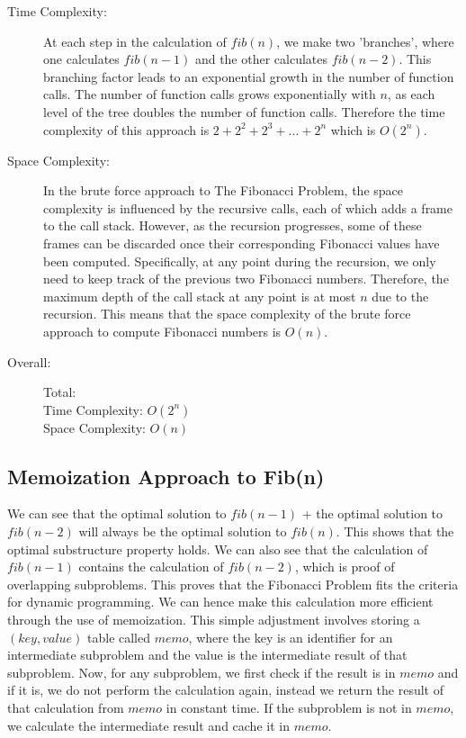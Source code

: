 \begin{description}
    \item[Time Complexity:]
    At each step in the calculation of $fib(n)$, we make two 'branches', where one calculates $fib(n-1)$ and the other calculates $fib(n-2)$.
    This branching factor leads to an exponential growth in the number of function calls.
    The number of function calls grows exponentially with $n$, as each level of the tree doubles the number of function calls.
    Therefore the time complexity of this approach is $2 + 2^2 + 2^3 + ... + 2^n$ which is $O(2^n)$.
        
    \item[Space Complexity:] 
        In the brute force approach to The Fibonacci Problem, the space complexity is influenced by the recursive calls, each of which adds a frame to the call stack. However, as the recursion progresses, some of these frames can be discarded once their corresponding Fibonacci values have been computed.
        Specifically, at any point during the recursion, we only need to keep track of the previous two Fibonacci numbers. Therefore, the maximum depth of the call stack at any point is at most $n$ due to the recursion.
        This means that the space complexity of the brute force approach to compute Fibonacci numbers is $O(n)$.
        
        
    \item[Overall:] Total:\\
        Time Complexity: $O(2^n)$\\
        Space Complexity: $O(n)$
        
\end{description}
\newpage

\subsection{Memoization Approach to Fib(n)}
We can see that the optimal solution to $fib(n-1)$ + the optimal solution to $fib(n-2)$ will always be the optimal solution to $fib(n)$. This shows that the optimal substructure property holds.
We can also see that the calculation of $fib(n-1)$ contains the calculation of $fib(n-2)$, which is proof of overlapping subproblems.
This proves that the Fibonacci Problem fits the criteria for dynamic programming.
We can hence make this calculation more efficient through the use of memoization.
This simple adjustment involves storing a $(key, value)$ table called $memo$, where the key is an identifier for an intermediate subproblem and the value is the intermediate result of that subproblem.
Now, for any subproblem, we first check if the result is in $memo$ and if it is, we do not perform the calculation again, instead we return the result of that calculation from $memo$ in constant time.
If the subproblem is not in $memo$, we calculate the intermediate result and cache it in $memo$.


